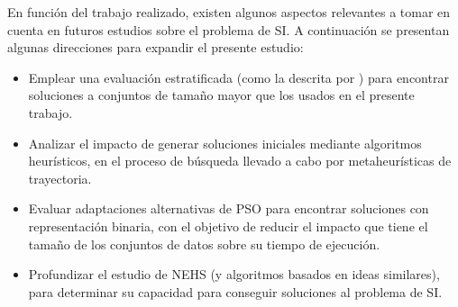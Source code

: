 En función del trabajo realizado, existen algunos aspectos relevantes a tomar en cuenta en futuros estudios sobre el problema de SI. A continuación se presentan algunas direcciones para expandir el presente estudio:

\begin{itemize}
\item Emplear una evaluación estratificada (como la descrita por \cite{cano2003using}) para encontrar soluciones a conjuntos de tamaño mayor que los usados en el presente trabajo.
\item Analizar el impacto de generar soluciones iniciales mediante algoritmos heurísticos, en el proceso de búsqueda llevado a cabo por metaheurísticas de trayectoria.
\item Evaluar adaptaciones alternativas de PSO para encontrar soluciones con representación binaria, con el objetivo de reducir el impacto que tiene el tamaño de los conjuntos de datos sobre su tiempo de ejecución.
\item Profundizar el estudio de NEHS (y algoritmos basados en ideas similares), para determinar su capacidad para conseguir soluciones al problema de SI.
\end{itemize}
